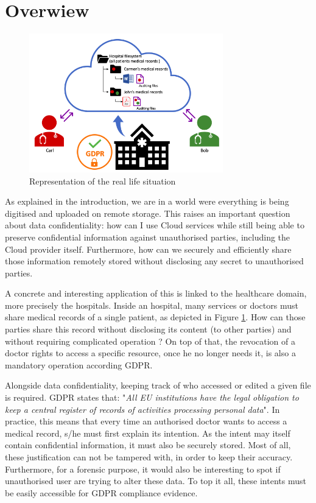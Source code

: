 \documentclass[../main.tex]{subfiles}
\begin{document}
\section{Overwiew}
\label{section:problem:overview}
\begin{figure}[h]
    \centering
    \includegraphics[width=0.75\textwidth]{../../images/problem/overview}
    
    \label{figure:problem:overview}
    \caption{Representation of the real life situation}
\end{figure}

\par As explained in the introduction, we are in a world were everything is being digitised and uploaded on remote storage. This raises an important question about data confidentiality: how can I use Cloud services while still being able to preserve confidential information against unauthorised parties, including the Cloud provider itself. Furthermore, how can we securely and efficiently share those information remotely stored without disclosing any secret to unauthorised parties.
\par A concrete and interesting application of this is linked to the healthcare domain, more precisely the hospitals. Inside an hospital, many services or doctors must share medical records of a single patient, as depicted in Figure \ref{figure:problem:overview}. How can those parties share this record without disclosing its content (to other parties) and without requiring complicated operation ? On top of that, the revocation of a doctor rights to access a specific resource, once he no longer needs it, is also a mandatory operation according GDPR.\\

\par Alongside data confidentiality, keeping track of who accessed or edited a given file is required. GDPR states that: "\textit{All EU institutions have the legal obligation to keep a central register of records of activities processing personal data}". In practice, this means that every time an authorised doctor wants to access a medical record, s/he must first explain its intention. As the intent may itself contain confidential information, it must also be securely stored. Most of all, these justification can not be tampered with, in order to keep their accuracy. Furthermore, for a forensic purpose, it would also be interesting to spot if unauthorised user are trying to alter these data. To top it all, these intents must be easily accessible for GDPR compliance evidence.

\end{document}
